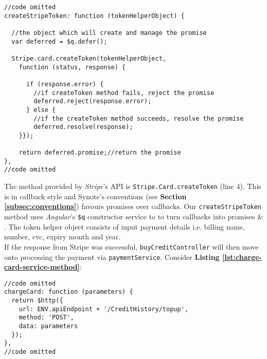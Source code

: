 \begin{listing}[H]
\begin{verbatim}
//code omitted
createStripeToken: function (tokenHelperObject) {

  //the object which will create and manage the promise
  var deferred = $q.defer();

  Stripe.card.createToken(tokenHelperObject,
    function (status, response) {

      if (response.error) {
        //if createToken method fails, reject the promise
        deferred.reject(response.error);
      } else {
        //if the createToken method succeeds, resolve the promise
        deferred.resolve(response);
    }});

    return deferred.promise;//return the promise
},
//code omitted
\end{verbatim}
\label{lst:create-token-payment-service-method}
\end{listing}

The method provided by \textit{Stripe}’s API is \texttt{Stripe.Card.createToken} (line 4). This is in callback style and Synote’s conventions (see \textbf{Section \ref{subsec:conventions}}) favours promises over callbacks. Our \texttt{createStripeToken} method uses \textit{Angular}’s \texttt{\$q} constructor service to to turn callbacks into promises \cite{jdotjdot} \& \cite{angularjsq}. The token helper object consists of input payment details i.e. billing name, number, cvc, expiry month and year.\\

If the response from Stripe was successful, \texttt{buyCreditController} will then move onto processing the payment via \texttt{paymentService}. Consider \textbf{Listing \ref{lst:charge-card-service-method}}:\\

\begin{listing}[H]
\begin{verbatim}
//code omitted
chargeCard: function (parameters) {
  return $http({
    url: ENV.apiEndpoint + '/CreditHistory/topup',
    method: 'POST',
    data: parameters
  });
},
//code omitted
\end{verbatim}
\label{lst:charge-card-service-method}
\end{listing}

